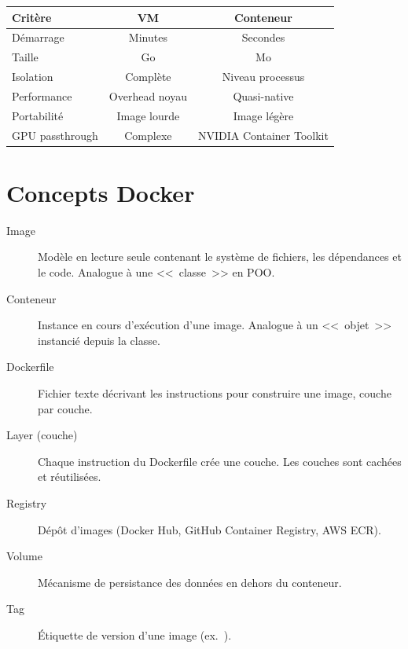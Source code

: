 \begin{center}
\begin{tabular}{@{}lcc@{}}
\toprule
\textbf{Crit\`ere} & \textbf{VM} & \textbf{Conteneur} \\
\midrule
D\'emarrage & Minutes & Secondes \\
Taille & Go & Mo \\
Isolation & Compl\`ete & Niveau processus \\
Performance & Overhead noyau & Quasi-native \\
Portabilit\'e & Image lourde & Image l\'eg\`ere \\
GPU passthrough & Complexe & NVIDIA Container Toolkit \\
\bottomrule
\end{tabular}
\end{center}

\section{Concepts Docker}
\label{sec:docker-concepts}

\begin{formules}[title=\textbf{Vocabulaire Docker essentiel}]
\begin{description}
  \item[Image] Mod\`ele en lecture seule contenant le
    syst\`eme de fichiers, les d\'ependances et le code. Analogue \`a une
    <<~classe~>> en POO.
  \item[Conteneur] Instance en cours d'ex\'ecution
    d'une image. Analogue \`a un <<~objet~>> instanci\'e depuis la classe.
  \item[Dockerfile] Fichier texte d\'ecrivant les
    instructions pour construire une image, couche par couche.
  \item[Layer (couche)] Chaque instruction du Dockerfile
    cr\'ee une couche. Les couches sont cach\'ees et r\'eutilis\'ees.
  \item[Registry] D\'ep\^ot d'images (Docker Hub,
    GitHub Container Registry, AWS ECR).
  \item[Volume] M\'ecanisme de persistance des donn\'ees
    en dehors du conteneur.
  \item[Tag] \'Etiquette de version d'une image (ex.\ ).
\end{description}
\end{formules}

